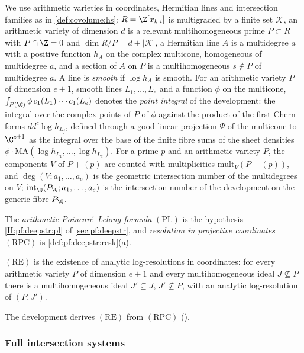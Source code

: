 We use arithmetic varieties in coordinates, Hermitian lines and intersection families as in \cref{def:covolume:hs}: $R=\Z[x_{k,i}]$ is
multigraded by a finite set $\mathcal K$, an arithmetic variety of dimension $d$ is a relevant multihomogeneous prime $P\subset R$ with
$P\cap\Z=0$ and $\dim R/P=d+|\mathcal K|$, a Hermitian line $A$ is a multidegree $a$ with a positive function $h_A$ on the complex
multicone, homogeneous of multidegree $a$, and a section of $A$ on $P$ is a multihomogeneous $s\notin P$ of multidegree $a$. A line is
\emph{smooth} if $\log h_A$ is smooth. For an arithmetic variety $P$ of dimension $e+1$, smooth lines $L_1,\dots,L_e$ and a function
$\phi$ on the multicone, $\int_{P(\C)}\phi\,c_1(L_1)\cdots c_1(L_e)$ denotes the \emph{point integral} of the development: the integral
over the complex points of $P$ of $\phi$ against the product of the first Chern forms $dd^c\log h_{L_j}$, defined through a good linear
projection $\Psi$ of the multicone to $\C^{e+1}$ as the integral over the base of the finite fibre sums of the sheet densities
$\phi\cdot\mathrm{MA}(\log h_{L_1},\dots,\log h_{L_e})$. For a prime $p$ and an arithmetic variety $P$, the components $V$ of $P+(p)$
are counted with multiplicities $\mathrm{mult}_V(P+(p))$, and $\deg(V;a_1,\dots,a_e)$ is the geometric intersection number of the
multidegrees on $V$; $\mathrm{int}_\Q(P_\Q;a_1,\dots,a_e)$ is the intersection number of the development on the generic fibre
$P_\Q$.

The \emph{arithmetic Poincar\'e--Lelong formula} $(\mathrm{PL})$ is the hypothesis \ref{H:pf:deepstr:pl} of \cref{sec:pf:deepstr}, and
\emph{resolution in projective coordinates} $(\mathrm{RPC})$ is \cref{def:pf:deepstr:resk}(a).

\begin{definition}\label{pf:sh-flag:defre}
$(\mathrm{RE})$ is the existence of analytic log-resolutions in coordinates: for every arithmetic variety $P$ of dimension $e+1$
and every multihomogeneous ideal $J\not\subseteq P$ there is a multihomogeneous ideal $J'\subseteq J$, $J'\not\subseteq P$, with an analytic
log-resolution of $(P,J')$.
\end{definition}
The development derives $(\mathrm{RE})$ from $(\mathrm{RPC})$ ().

\subsubsection{Full intersection systems}

